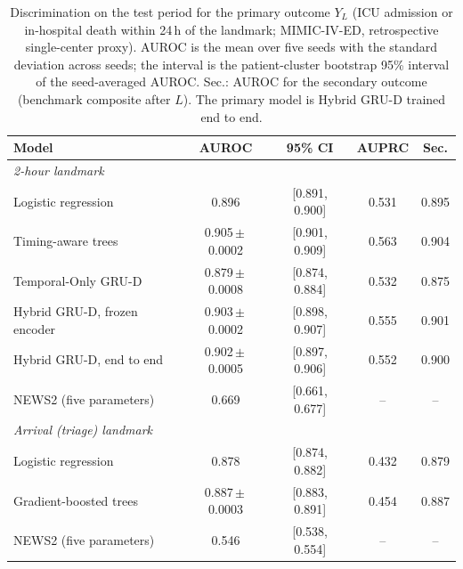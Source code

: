 \begin{table}[t]
\centering
\caption{Discrimination on the test period for the primary outcome $Y_L$ (ICU admission or in-hospital death within 24\,h of the landmark; MIMIC-IV-ED, retrospective single-center proxy). AUROC is the mean over five seeds with the standard deviation across seeds; the interval is the patient-cluster bootstrap 95\% interval of the seed-averaged AUROC. Sec.: AUROC for the secondary outcome (benchmark composite after $L$). The primary model is Hybrid GRU-D trained end to end.}
\label{tab:discrimination}
\begin{tabular}{lcccc}
\toprule
Model & AUROC & 95\% CI & AUPRC & Sec. \\
\midrule
\multicolumn{5}{l}{\emph{2-hour landmark}} \\
Logistic regression & 0.896 & [0.891, 0.900] & 0.531 & 0.895 \\
Timing-aware trees & 0.905\,$\pm$\,0.0002 & [0.901, 0.909] & 0.563 & 0.904 \\
Temporal-Only GRU-D & 0.879\,$\pm$\,0.0008 & [0.874, 0.884] & 0.532 & 0.875 \\
Hybrid GRU-D, frozen encoder & 0.903\,$\pm$\,0.0002 & [0.898, 0.907] & 0.555 & 0.901 \\
Hybrid GRU-D, end to end & 0.902\,$\pm$\,0.0005 & [0.897, 0.906] & 0.552 & 0.900 \\
NEWS2 (five parameters) & 0.669 & [0.661, 0.677] & -- & -- \\
\midrule
\multicolumn{5}{l}{\emph{Arrival (triage) landmark}} \\
Logistic regression & 0.878 & [0.874, 0.882] & 0.432 & 0.879 \\
Gradient-boosted trees & 0.887\,$\pm$\,0.0003 & [0.883, 0.891] & 0.454 & 0.887 \\
NEWS2 (five parameters) & 0.546 & [0.538, 0.554] & -- & -- \\
\bottomrule
\end{tabular}
\end{table}
